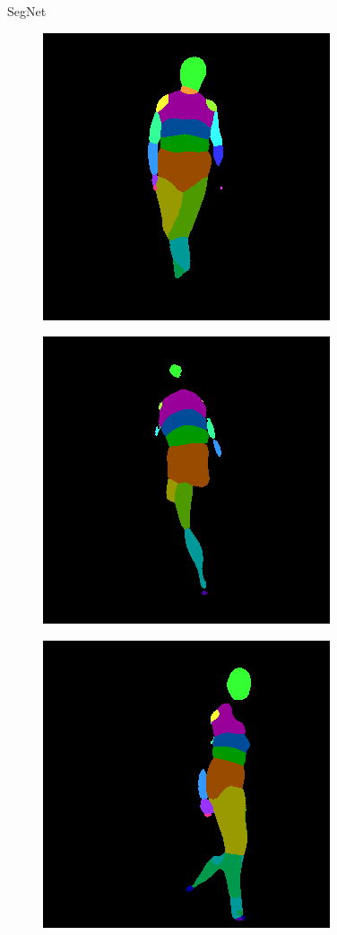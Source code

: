 \documentclass{beamer}
\begin{document}
\begin{frame}
\begin{figure}
\end{figure}
\begin{figure}
SegNet
\centering
\begin{subfigure}{.19\textwidth}
\centering
  \includegraphics[scale=0.12]{ung_104_36_c0011_segm_7_seg.png}
\end{subfigure}
\begin{subfigure}{.19\textwidth}
  \centering
  \includegraphics[scale=0.12]{36_10_c0019_segm_10_seg.png}
\end{subfigure}
\begin{subfigure}{.19\textwidth}
  \centering
  \includegraphics[scale=0.12]{40_02_c0011_segm_19_seg.png}

\end{subfigure}
\end{figure}
\end{frame}
\end{document}
